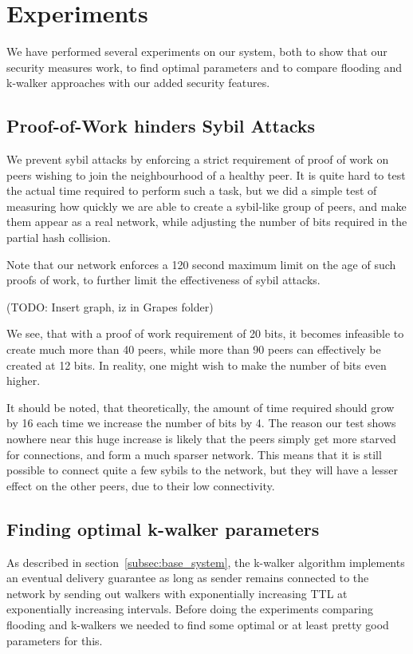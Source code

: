 \section{Experiments}
We have performed several experiments on our system, both to show that our security measures work, to find optimal parameters and to compare flooding and k-walker approaches with our added security features.

\subsection{Proof-of-Work hinders Sybil Attacks}
We prevent sybil attacks by enforcing a strict requirement of proof of work on peers wishing to join the neighbourhood of a healthy peer. It is quite hard to test the actual time required to perform such a task, but we did a simple test of measuring how quickly we are able to create a sybil-like group of peers, and make them appear as a real network, while adjusting the number of bits required in the partial hash collision.

Note that our network enforces a 120 second maximum limit on the age of such proofs of work, to further limit the effectiveness of sybil attacks.

(TODO: Insert graph, iz in Grapes folder)

We see, that with a proof of work requirement of 20 bits, it becomes infeasible to create much more than 40 peers, while more than 90 peers can effectively be created at 12 bits. In reality, one might wish to make the number of bits even higher.

It should be noted, that theoretically, the amount of time required should grow by 16 each time we increase the number of bits by 4. The reason our test shows nowhere near this huge increase is likely that the peers simply get more starved for connections, and form a much sparser network. This means that it is still possible to connect quite a few sybils to the network, but they will have a lesser effect on the other peers, due to their low connectivity.

\subsection{Finding optimal k-walker parameters}
As described in section~\ref{subsec:base_system}, the k-walker algorithm implements an eventual delivery guarantee as long as sender remains connected to the network by sending out walkers with exponentially increasing TTL at exponentially increasing intervals. Before doing the experiments comparing flooding and k-walkers we needed to find some optimal or at least pretty good parameters for this.

